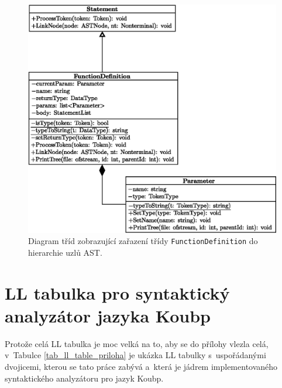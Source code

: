 \begin{figure}[h!]
	\centering
	\includegraphics[width=\textwidth]{obrazky-figures/funcdef_hierarchy.eps}
	\caption{Diagram tříd zobrazující zařazení třídy \texttt{FunctionDefinition} do hierarchie uzlů AST.}
	\label{fig_hierarchie_funcdef}	
\end{figure}

\chapter{LL tabulka pro syntaktický analyzátor jazyka Koubp} \label{kap_priloha_d}

Protože celá LL tabulka je moc velká na to, aby se do přílohy vlezla celá, v~Tabulce \ref{tab_ll_table_priloha} je ukázka LL tabulky s~uspořádanými dvojicemi, kterou se tato práce zabývá a~která je jádrem implementovaného syntaktického analyzátoru pro jazyk Koubp.

